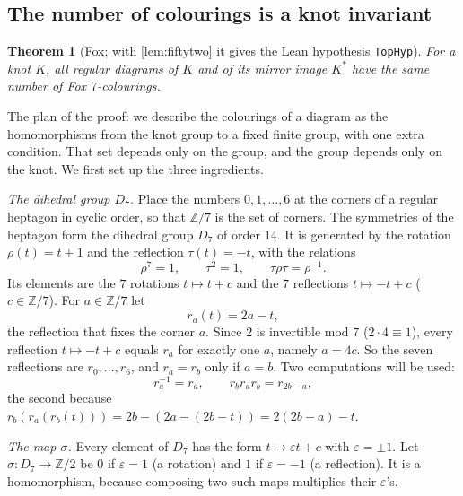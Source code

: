\documentclass[11pt]{article}
\theoremstyle{plain}
\newtheorem{theorem}{Theorem}[section]
\theoremstyle{definition}
\theoremstyle{remark}
\newcommand{\Z}{\mathbb{Z}}
\newcommand{\lean}[1]{\texttt{#1}}
\begin{document}
\subsection{The number of colourings is a knot invariant}

\begin{theorem}[Fox; with \cref{lem:fiftytwo} it gives the Lean hypothesis \lean{TopHyp}]\label{thm:fox}
For a knot $K$, all regular diagrams of $K$ and of its mirror image $K^*$ have the same number of Fox
$7$-colourings.
\end{theorem}

The plan of the proof: we describe the colourings of a diagram as the homomorphisms from the knot group
to a fixed finite group, with one extra condition. That set depends only on the group, and the group
depends only on the knot. We first set up the three ingredients.

\emph{The dihedral group $D_7$.} Place the numbers $0,1,\dots,6$ at the corners of a regular heptagon in
cyclic order, so that $\Z/7$ is the set of corners. The symmetries of the heptagon form the dihedral
group $D_7$ of order $14$. It is generated by the rotation $\rho(t)=t+1$ and the reflection
$\tau(t)=-t$, with the relations
\[ \rho^7=1,\qquad \tau^2=1,\qquad \tau\rho\tau=\rho^{-1}. \]
Its elements are the $7$ rotations $t\mapsto t+c$ and the $7$ reflections $t\mapsto -t+c$
($c\in\Z/7$). For $a\in\Z/7$ let
\[ r_a(t)=2a-t, \]
the reflection that fixes the corner $a$. Since $2$ is invertible mod $7$ ($2\cdot4\equiv1$), every
reflection $t\mapsto -t+c$ equals $r_a$ for exactly one $a$, namely $a=4c$. So the seven reflections are
$r_0,\dots,r_6$, and $r_a=r_b$ only if $a=b$. Two computations will be used:
\[ r_a^{-1}=r_a, \qquad r_br_ar_b=r_{2b-a}, \]
the second because $r_b(r_a(r_b(t)))=2b-(2a-(2b-t))=2(2b-a)-t$.

\emph{The map $\sigma$.} Every element of $D_7$ has the form $t\mapsto\varepsilon t+c$ with
$\varepsilon=\pm1$. Let $\sigma:D_7\to\Z/2$ be $0$ if $\varepsilon=1$ (a rotation) and $1$ if
$\varepsilon=-1$ (a reflection). It is a homomorphism, because composing two such maps multiplies their
$\varepsilon$'s.
\end{document}
